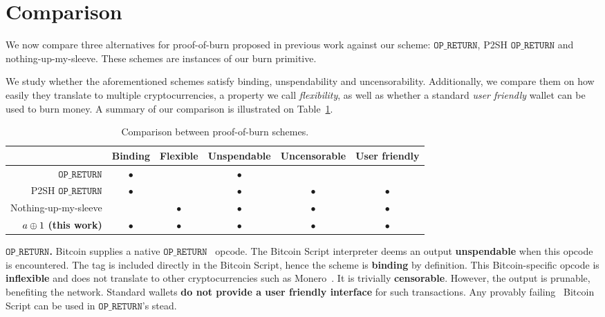\section{Comparison}
\newcommand{\opreturn}{\texttt{OP\_RETURN}}

We now compare three alternatives for proof-of-burn proposed in previous work against our scheme: $\opreturn$, P2SH $\opreturn$ and nothing-up-my-sleeve. These schemes are instances of our burn primitive.

We study whether the aforementioned schemes satisfy binding, unspendability and uncensorability. Additionally, we compare them on how easily they translate to multiple cryptocurrencies, a property we call \emph{flexibility}, as well as whether a standard \emph{user friendly} wallet can be used to burn money. A summary of our comparison is illustrated on Table~\ref{table:comparison}.

\begin{table}
    \newcommand{\y}{$\bullet$}
    \newcommand{\n}{}
    \centering
    \caption{Comparison between proof-of-burn schemes.\label{table:comparison}}

    \begin{tabular}{ |r|c|c|c|c|c| }
     \hline
                                        & Binding & Flexible & Unspendable & Uncensorable & User friendly \\
     \hline
     $\opreturn$                        & \y      & \n       & \y          & \n & \n \\
     P2SH $\opreturn$                   & \y      & \n       & \y          & \y & \y \\
     Nothing-up-my-sleeve               & \n      & \y       & \y          & \y & \y \\
     $a \oplus 1$ \textbf{(this work)}    & \y      & \y       & \y          & \y & \y \\
     \hline
    \end{tabular}
\end{table}

\noindent
\textbf{$\opreturn$.}
Bitcoin supplies a native $\opreturn$~\cite{bartoletti2017analysis} opcode.
The Bitcoin Script interpreter deems an output \textbf{unspendable} when this opcode is encountered.
The tag is included directly in the Bitcoin Script, hence the scheme is \textbf{binding} by definition.
This Bitcoin-specific opcode is \textbf{inflexible} and does not translate to other cryptocurrencies such as Monero~\cite{van2013cryptonote}.
It is trivially \textbf{censorable}.
However, the output is prunable, benefiting the network.
Standard wallets \textbf{do not provide a user friendly interface} for such transactions.
Any provably failing~\cite{stewart} Bitcoin Script can be used in $\opreturn$'s stead.

